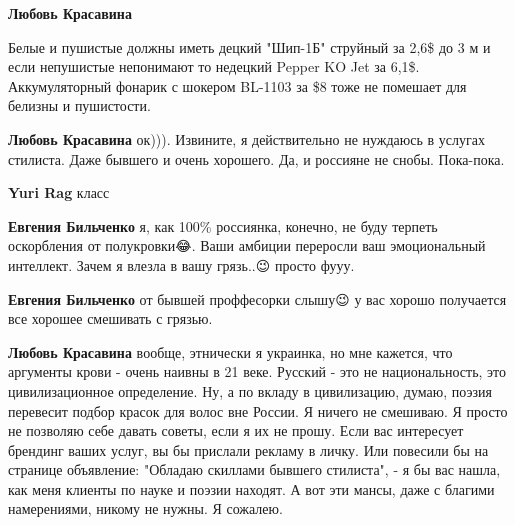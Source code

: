 \begin{itemize}
\begin{itemize}
\textbf{Любовь Красавина} 

Белые и пушистые должны иметь децкий "Шип-1Б"
струйный за 2,6\$ до 3 м и если непушистые непонимают то недецкий Pepper KO Jet
за 6,1\$. Аккумуляторный фонарик с шокером BL-1103 за \$8 тоже не помешает для
белизны и пушистости.


 
\textbf{Любовь Красавина} ок))). Извините, я действительно не нуждаюсь в услугах стилиста. Даже бывшего и очень хорошего. Да, и россияне не снобы. Пока-пока.

 
\textbf{Yuri Rag} класс

 
\textbf{Евгения Бильченко} я, как 100\% россиянка, конечно, не буду терпеть оскорбления от полукровки😂. Ваши амбиции переросли ваш эмоциональный интеллект.
Зачем я влезла в вашу грязь..😉 просто фууу.

 
\textbf{Евгения Бильченко} от бывшей проффесорки слышу😉 у вас хорошо получается все хорошее смешивать с грязью.

 
\textbf{Любовь Красавина} вообще, этнически я украинка, но мне кажется, что
аргументы крови - очень наивны в 21 веке. Русский - это не национальность, это
цивилизационное определение. Ну, а по вкладу в цивилизацию, думаю, поэзия
перевесит подбор красок для волос вне России. Я ничего не смешиваю. Я просто не
позволяю себе давать советы, если я их не прошу. Если вас интересует брендинг
ваших услуг, вы бы прислали рекламу в личку. Или повесили бы на странице
объявление: "Обладаю скиллами бывшего стилиста", - я бы вас нашла, как меня
клиенты по науке и поэзии находят. А вот эти мансы, даже с благими намерениями,
никому не нужны. Я сожалею.


\end{itemize}
\end{itemize}
